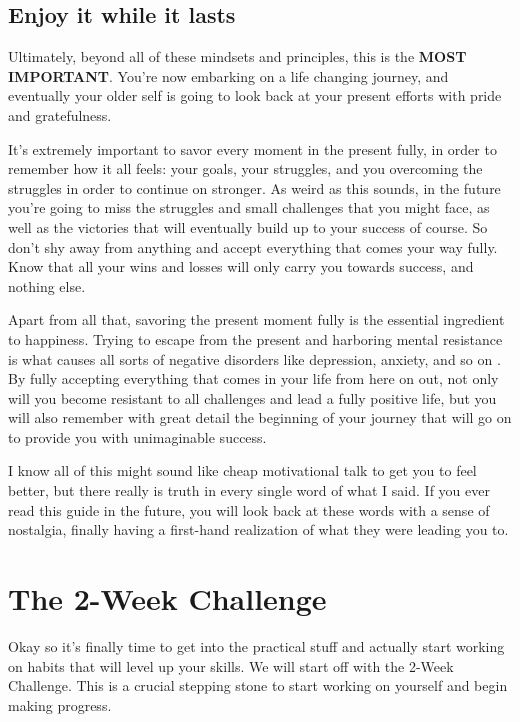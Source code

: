 \documentclass[
]{book}
\begin{document}
\hypertarget{enjoy-it-while-it-lasts}{%
\section{Enjoy it while it lasts}\label{enjoy-it-while-it-lasts}}

Ultimately, beyond all of these mindsets and principles, this is the \textbf{MOST IMPORTANT}. You're now embarking on a life changing journey, and eventually your older self is going to look back at your present efforts with pride and gratefulness.

It's extremely important to savor every moment in the present fully, in order to remember how it all feels: your goals, your struggles, and you overcoming the struggles in order to continue on stronger. As weird as this sounds, in the future you're going to miss the struggles and small challenges that you might face, as well as the victories that will eventually build up to your success of course. So don't shy away from anything and accept everything that comes your way fully. Know that all your wins and losses will only carry you towards success, and nothing else.

Apart from all that, savoring the present moment fully is the essential ingredient to happiness. Trying to escape from the present and harboring mental resistance is what causes all sorts of negative disorders like depression, anxiety, and so on \citep{savoring}. By fully accepting everything that comes in your life from here on out, not only will you become resistant to all challenges and lead a fully positive life, but you will also remember with great detail the beginning of your journey that will go on to provide you with unimaginable success.

I know all of this might sound like cheap motivational talk to get you to feel better, but there really is truth in every single word of what I said. If you ever read this guide in the future, you will look back at these words with a sense of nostalgia, finally having a first-hand realization of what they were leading you to.

\hypertarget{the-2-week-challenge}{%
\chapter{The 2-Week Challenge}\label{the-2-week-challenge}}

Okay so it's finally time to get into the practical stuff and actually start working on habits that will level up your skills. We will start off with the 2-Week Challenge. This is a crucial stepping stone to start working on yourself and begin making progress.
\end{document}
